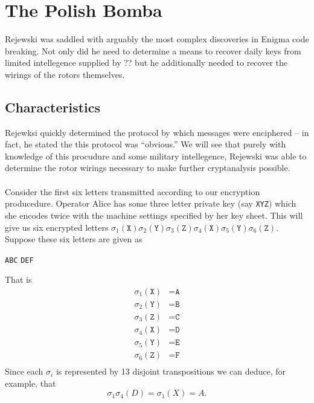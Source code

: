 \chapter{The Polish Bomba}

Rejewski was saddled with arguably the most complex discoveries in Enigma code breaking. Not only did he need to determine a means to recover daily keys from limited intellegence supplied by ?? but he additionally needed to recover the wirings of the rotors themselves.
\section{Characteristics}
Rejewksi quickly determined the protocol by which messages were enciphered -- in fact, he stated the this protocol was ``obvious.'' We will see that purely with knowledge of this procudure and some military intellegence, Rejewski was able to determine the rotor wirings necessary to make further cryptanalysis possible.
\\\\Consider the first six letters transmitted according to our encryption producedure. Operator Alice has some three letter private key (say \texttt{XYZ}) which she encodes twice with the machine settings specified by her key sheet. This will give us six encrypted letters $\sigma_1(\texttt{X})\sigma_2(\texttt{Y})\sigma_3(\texttt{Z})\sigma_4(\texttt{X})\sigma_5(\texttt{Y})\sigma_6(\texttt{Z})$. Suppose these six letters are given as
\begin{center}
	\texttt{ABC} \texttt{DEF}
\end{center}
That is
\begin{align*}
	\sigma_1(\texttt{X}) & = \texttt{A} \\
	\sigma_2(\texttt{Y}) & = \texttt{B} \\
	\sigma_3(\texttt{Z}) & = \texttt{C} \\
	\sigma_4(\texttt{X}) & = \texttt{D} \\
	\sigma_5(\texttt{Y}) & = \texttt{E} \\
	\sigma_6(\texttt{Z}) & = \texttt{F} \\
\end{align*}
Since each $\sigma_i$ is represented by 13 disjoint transpositions we can deduce, for example, that
\[
	\sigma_1\sigma_4(D) = \sigma_1(X) = A.
\]
